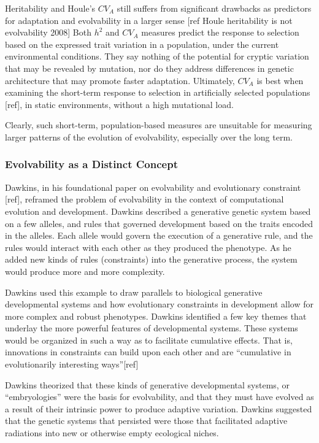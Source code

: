 Heritability and Houle’s $CV_A$ still suffers from significant drawbacks as predictors for adaptation and evolvability in a larger sense [ref Houle heritability is not evolvability 2008] Both $h^2$ and $CV_A$ measures predict the response to selection based on the expressed trait variation in a population, under the current environmental conditions. They say nothing of the potential for cryptic variation that may be revealed by mutation, nor do they address differences in genetic architecture that may promote faster adaptation. Ultimately, $CV_A$ is best when examining the short-term response to selection in artificially selected populations [ref], in static environments, without a high mutational load.

Clearly, such short-term, population-based measures are unsuitable for measuring larger patterns of the evolution of evolvability, especially over the long term.

\subsubsection{Evolvability as a Distinct Concept}

Dawkins, in his foundational paper on evolvability and evolutionary constraint [ref], reframed the problem of evolvability in the context of computational evolution and development.  Dawkins described a generative genetic system based on a few alleles, and rules that governed development based on the traits encoded in the alleles.  Each allele would govern the execution of a generative rule, and the rules would interact with each other as they produced the phenotype. As he added new kinds of rules (constraints) into the generative process, the system would produce more and more complexity.

Dawkins used this example to draw parallels to biological generative developmental systems and how evolutionary constraints in development allow for more complex and robust phenotypes. Dawkins identified a few key themes that underlay the more powerful features of developmental systems. These systems would be organized in such a way as to facilitate cumulative effects. That is, innovations in constraints can build upon each other and are “cumulative in evolutionarily interesting ways”[ref]

Dawkins theorized that these kinds of generative developmental systems, or “embryologies” were the basis for evolvability, and that they must have evolved as a result of their intrinsic power to produce adaptive variation. Dawkins suggested that the genetic systems that persisted were those that facilitated adaptive radiations into new or otherwise empty ecological niches.

